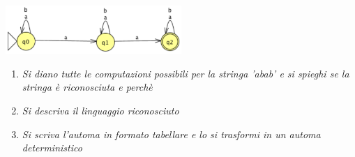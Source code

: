 \documentclass[12pt, a4paper]{report}
\begin{document}
        \begin{exercise}
            \textit{}
            \begin{center}
                \includegraphics[width=0.5\textwidth]{Images/nfaluglio2022.png}
            \end{center}
            \begin{enumerate}
                \item \textit{Si diano tutte le computazioni possibili per la stringa 'abab' e si spieghi se la stringa è riconosciuta e perchè} 
                \item \textit{Si descriva il linguaggio riconosciuto}
                \item \textit{Si scriva l'automa in formato tabellare e lo si trasformi in un automa deterministico}
            \end{enumerate}
        \end{exercise}
\end{document}
